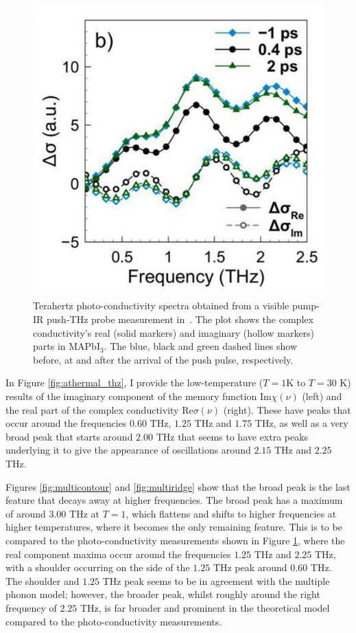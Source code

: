 \begin{figure}[t]  
    \centering
    \includegraphics[width=.7\textwidth]{figures/thz_plot.pdf}
    
    \caption{Terahertz photo-conductivity spectra obtained from a visible pump-IR push-THz probe measurement in~\cite{zheng_multipulse_2021}. The plot shows the complex conductivity's real (solid markers) and imaginary (hollow markers) parts in MAPbI$_3$. The blue, black and green dashed lines show before, at and after the arrival of the push pulse, respectively.}
    \label{fig:thzplot}
\end{figure}

In Figure \ref{fig:athermal_thz}, I provide the low-temperature ($T = 1$K to $T = 30$ K) results of the imaginary component of the memory function $\text{Im}\chi(\nu)$ (left) and the real part of the complex conductivity $\text{Re}\sigma(\nu)$ (right). These have peaks that occur around the frequencies $0.60$ THz, $1.25$ THz and $1.75$ THz, as well as a very broad peak that starts around $2.00$ THz that seems to have extra peaks underlying it to give the appearance of oscillations around $2.15$ THz and $2.25$ THz. 

Figures \ref{fig:multicontour} and \ref{fig:multiridge} show that the broad peak is the last feature that decays away at higher frequencies. The broad peak has a maximum of around $3.00$ THz at $T = 1$, which flattens and shifts to higher frequencies at higher temperatures, where it becomes the only remaining feature. This is to be compared to the photo-conductivity measurements shown in Figure \ref{fig:thzplot}, where the real component maxima occur around the frequencies $1.25$ THz and $2.25$ THz, with a shoulder occurring on the side of the $1.25$ THz peak around $0.60$ THz. The shoulder and $1.25$ THz peak seems to be in agreement with the multiple phonon model; however, the broader peak, whilst roughly around the right frequency of $2.25$ THz, is far broader and prominent in the theoretical model compared to the photo-conductivity measurements. 


